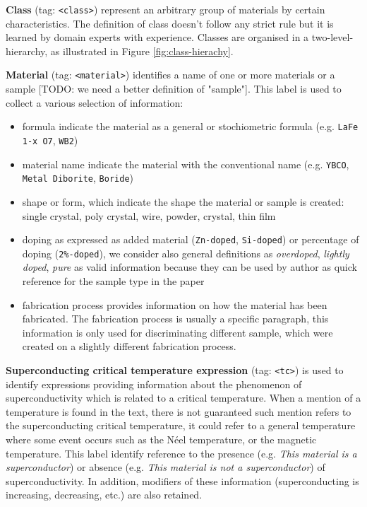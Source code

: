\documentclass[a4paper,10pt]{article}
\begin{document}
\textbf{Class} (tag: \texttt{<class>}) represent an arbitrary group of materials by certain characteristics. The definition of class doesn't follow any strict rule but it is learned by domain experts with experience. Classes are organised in a two-level-hierarchy, as illustrated in Figure \ref{fig:class-hierachy}. 

\textbf{Material} (tag: \texttt{<material>}) identifies a name of one or more materials or a sample [TODO: we need a better definition of "sample"]. 
This label is used to collect a various selection of information: 
\begin{itemize}
    \item formula indicate the material as a general or stochiometric formula (e.g. \texttt{LaFe 1-x O7}, \texttt{WB2})
    \item material name indicate the material with the conventional name (e.g. \texttt{YBCO}, \texttt{Metal Diborite}, \texttt{Boride})
    \item shape or form, which indicate the shape the material or sample is created: single crystal, poly crystal, wire, powder, crystal, thin film
    \item doping as expressed as added material (\texttt{Zn-doped}, \texttt{Si-doped}) or percentage of doping (\texttt{2\%-doped}), we consider also general definitions as \textit{overdoped}, \textit{lightly doped}, \textit{pure} as valid information because they can be used by author as quick reference for the sample type in the paper 
    \item fabrication process provides information on how the material has been fabricated. The fabrication process is usually a specific paragraph, this information is only used for discriminating different sample, which were created on a slightly different fabrication process. 
\end{itemize}

\textbf{Superconducting critical temperature expression} (tag: \texttt{<tc>}) is used to identify expressions providing information about the phenomenon of superconductivity which is related to a critical temperature. When a mention of a temperature is found in the text, there is not guaranteed such mention refers to the superconducting critical temperature, it could refer to a general temperature where some event occurs such as the Néel temperature, or the magnetic temperature. This label identify reference to the presence (e.g. \textit{This material is a superconductor}) or absence (e.g. \textit{This material is not a superconductor}) of superconductivity.
In addition, modifiers of these information (superconducting is increasing, decreasing, etc.) are also retained. 
\end{document}
